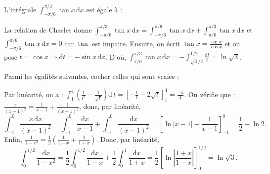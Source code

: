 \begin{question}
L'intégrale $\displaystyle \int _{-\pi/6}^{\pi/3}\tan x\, \mathrm{d}x$ est égale à :
\begin{answers}  
\end{answers}
\vskip3mm
\begin{explanations} La relation de Chasles donne
$\displaystyle \int _{-\pi/6}^{\pi/3}\tan x\, \mathrm{d}x=\int _{-\pi/6}^{\pi/6}\tan x\, \mathrm{d}x+\int _{\pi/6}^{\pi/3}\tan x\, \mathrm{d}x$ et $\displaystyle \int _{-\pi/6}^{\pi/6}\tan x\, \mathrm{d}x=0$ car $\tan $ est impaire. Ensuite, on écrit $\displaystyle \tan x=\frac{\sin x}{\cos x}$ et on pose $t=\cos x\Rightarrow \mathrm{d}t=-\sin x\, \mathrm{d}x$. D'où,
$\displaystyle \int _{\pi/6}^{\pi/3}\tan x\, \mathrm{d}x=-\int _{\sqrt{3}/2}^{1/2}\frac{\mathrm{d}t}{t}=\ln \sqrt{3}$.
\end{explanations}
\end{question}

\begin{question}
Parmi les égalités suivantes, cocher celles qui sont vraies :
\begin{answers}
\end{answers}
\vskip3mm
\begin{explanations}
Par linéarité, on a : $\displaystyle \int _{1}^{4}\left(\frac{1}{t^2}-\frac{1}{\sqrt{t}}\right)\mathrm{d}\, t=\left[-\frac{1}{t}-2\sqrt{t}\right]_1^4=\frac{-5}{4}$.
\vskip0mm
On vérifie que : $\displaystyle\frac{x}{(x-1)^2}=\frac{1}{x-1}+\frac{1}{(x-1)^2}$, donc, par linéarité,
$$\displaystyle \int _{-1}^{0}\frac{x\, \mathrm{d}x}{(x-1)^2}=\int _{-1}^{0}\frac{\mathrm{d}x}{x-1}+\int _{-1}^{0}\frac{\mathrm{d}x}{(x-1)^2}=\left[\ln |x-1|-\frac{1}{x-1}\right]_{-1}^{0}=\frac{1}{2}-\ln 2.$$
Enfin, $\displaystyle \frac{1}{1-x^2}=\frac{1}{2}\left(\frac{1}{1-x}+\frac{1}{1+x}\right)$. Donc, par linéarité,
$$\displaystyle \int _0^{1/2}\frac{\mathrm{d}x}{1-x^2}=\frac{1}{2}\int _0^{1/2}\frac{\mathrm{d}x}{1-x}+\frac{1}{2}\int _0^1\frac{\mathrm{d}x}{1+x}=\frac{1}{2}\left[\ln \left|\frac{1+x}{1-x}\right|\right]_0^{1/2}=\ln \sqrt{3}.$$
\end{explanations}
\end{question}


